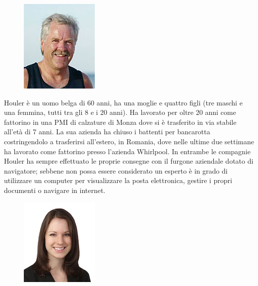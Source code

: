 \documentclass[12pt,a4paper,openright, notitlepage]{report}
\begin{document}
\begin{figure}
  \vspace{-30pt}
  \begin{center}
    \includegraphics{imgs/houler.jpg}
  \end{center}
  \vspace{-30pt}
\end{figure}

Houler è un uomo belga di 60 anni, ha una moglie e quattro figli (tre maschi e una femmina, tutti tra gli 8 e i 20 anni). Ha lavorato per oltre 20 anni come fattorino in una PMI di calzature di Monza dove si è trasferito in via stabile all’età di 7 anni. La sua azienda ha chiuso i battenti per bancarotta costringendolo a trasferirsi all’estero, in Romania, dove nelle ultime due settimane ha lavorato come fattorino presso l’azienda Whirlpool. In entrambe le compagnie Houler ha sempre effettuato le proprie consegne con il furgone aziendale dotato di navigatore; sebbene non possa essere considerato un esperto è in grado di utilizzare un computer per visualizzare la posta elettronica, gestire i propri documenti o navigare in internet.

\begin{figure}
  \vspace{-30pt}
  \begin{center}
    \includegraphics{imgs/veronica.jpg}
  \end{center}
  \vspace{-30pt}
\end{figure}

\newpage
\end{document}
